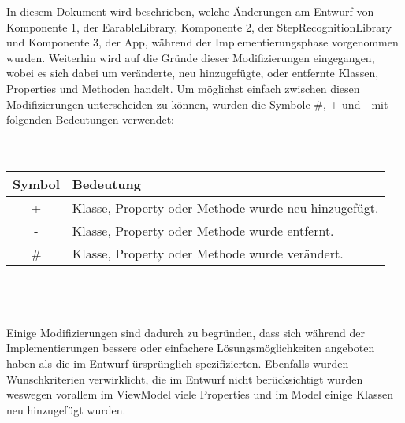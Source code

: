 \documentclass[../implementierung.tex]{subfiles}
\begin{document}
	In diesem Dokument wird beschrieben, welche Änderungen am Entwurf von Komponente 1, der EarableLibrary, Komponente 2, der StepRecognitionLibrary und Komponente 3, der App, während der Implementierungsphase vorgenommen wurden. Weiterhin wird auf die Gründe dieser Modifizierungen eingegangen, wobei es sich dabei um veränderte, neu hinzugefügte, oder entfernte Klassen, Properties und Methoden handelt. Um möglichst einfach zwischen diesen Modifizierungen unterscheiden zu können, wurden die Symbole \#, + und - mit folgenden Bedeutungen verwendet:
	\\
	\\
	\\
	\begin{tabular}[h]{|c|l|}
	\hline 
	Symbol & Bedeutung \\
	\hline 
	+ & Klasse, Property oder Methode wurde neu hinzugefügt. \\
	\hline 
	- & Klasse, Property oder Methode wurde entfernt. \\
	\hline 
	\# & Klasse, Property oder Methode wurde verändert. \\
	\hline 
	\end{tabular}
	\\
	\\
	\\
	Einige Modifizierungen sind dadurch zu begründen, dass sich während der Implementierungen bessere oder einfachere Lösungsmöglichkeiten angeboten haben als die im Entwurf ürsprünglich spezifizierten. Ebenfalls wurden Wunschkriterien verwirklicht, die im Entwurf nicht berücksichtigt wurden weswegen vorallem im ViewModel viele Properties und im Model einige Klassen neu hinzugefügt wurden.
\end{document}
